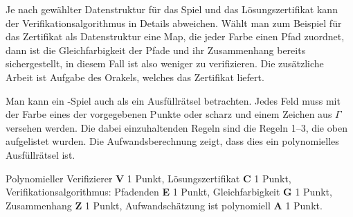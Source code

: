 \begin{loesung}
Je nach gewählter Datenstruktur für das Spiel und das Lösungszertifikat
kann der Verifikationsalgorithmus in Details abweichen.
Wählt man zum Beispiel für das Zertifikat als Datenstruktur eine Map,
die jeder Farbe einen Pfad zuordnet, dann ist die Gleichfarbigkeit der
Pfade und ihr Zusammenhang bereits sichergestellt, in diesem Fall
ist also weniger zu verifizieren.
Die zusätzliche Arbeit ist Aufgabe des Orakels, welches das Zertifikat
liefert.

Man kann ein \spielname-Spiel auch als ein Ausfüllrätsel betrachten.
Jedes Feld muss mit der Farbe eines der vorgegebenen Punkte oder scharz 
und einem Zeichen aus $\Gamma$ versehen werden.
Die dabei einzuhaltenden Regeln sind die Regeln 1--3, die oben aufgelistet
wurden.
Die Aufwandsberechnung zeigt, dass dies ein polynomielles Ausfüllrätsel ist.
\end{loesung}

\begin{bewertung}
Polynomieller Verifizierer {\bf V} 1 Punkt,
Lösungszertifikat {\bf C} 1 Punkt,
Verifikationsalgorithmus: Pfadenden {\bf E} 1 Punkt,
Gleichfarbigkeit {\bf G} 1 Punkt,
Zusammenhang {\bf Z} 1 Punkt,
Aufwandschätzung ist polynomiell {\bf A} 1 Punkt.
\end{bewertung}


